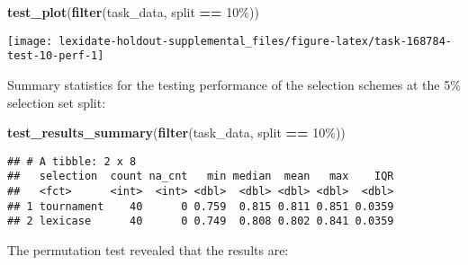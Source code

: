 \documentclass[
]{book}
\newenvironment{Shaded}{\begin{snugshade}}{\end{snugshade}}
\newcommand{\AttributeTok}[1]{\textcolor[rgb]{0.13,0.29,0.53}{#1}}
\newcommand{\DecValTok}[1]{\textcolor[rgb]{0.00,0.00,0.81}{#1}}
\newcommand{\FunctionTok}[1]{\textcolor[rgb]{0.13,0.29,0.53}{\textbf{#1}}}
\newcommand{\NormalTok}[1]{#1}
\newcommand{\OtherTok}[1]{\textcolor[rgb]{0.56,0.35,0.01}{#1}}
\newcommand{\SpecialCharTok}[1]{\textcolor[rgb]{0.81,0.36,0.00}{\textbf{#1}}}
\newcommand{\StringTok}[1]{\textcolor[rgb]{0.31,0.60,0.02}{#1}}
\begin{document}
\begin{Shaded}
\begin{Highlighting}[]
\FunctionTok{test\_plot}\NormalTok{(}\FunctionTok{filter}\NormalTok{(task\_data, split }\SpecialCharTok{==} \StringTok{\textquotesingle{}10\%\textquotesingle{}}\NormalTok{))}
\end{Highlighting}
\end{Shaded}

\texttt{[image: lexidate-holdout-supplemental\_files/figure-latex/task-168784-test-10-perf-1]}

Summary statistics for the testing performance of the selection schemes at the 5\% selection set split:

\begin{Shaded}
\begin{Highlighting}[]
\FunctionTok{test\_results\_summary}\NormalTok{(}\FunctionTok{filter}\NormalTok{(task\_data, split }\SpecialCharTok{==} \StringTok{\textquotesingle{}10\%\textquotesingle{}}\NormalTok{))}
\end{Highlighting}
\end{Shaded}

\begin{verbatim}
## # A tibble: 2 x 8
##   selection  count na_cnt   min median  mean   max    IQR
##   <fct>      <int>  <int> <dbl>  <dbl> <dbl> <dbl>  <dbl>
## 1 tournament    40      0 0.759  0.815 0.811 0.851 0.0359
## 2 lexicase      40      0 0.749  0.808 0.802 0.841 0.0359
\end{verbatim}

The permutation test revealed that the results are:

\begin{Shaded}
\end{Shaded}
\end{document}
